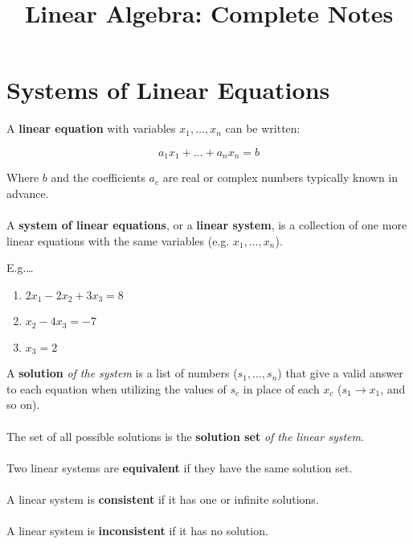 \documentclass[12pt]{article}
\title{Linear Algebra: Complete Notes}
\begin{document}
\maketitle

\section*{Systems of Linear Equations}

A \textbf{linear equation} with variables $x_1,\dots,x_n$ can be written:

$$a_1x_1+\dots+a_nx_n = b$$

Where $b$ and the coefficients $a_c$ are real or complex numbers typically
known in advance. \\ \\

A \textbf{system of linear equations}, or a \textbf{linear system}, is a collection
of one more linear equations with the same variables (e.g. $x_1,\dots,x_n$).

E.g.\dots

\begin{enumerate}
    \item $2x_1 -2x_2 +3x_3 = 8$
    \item $x_2 -4x_3 = -7$
    \item $x_3 = 2$
\end{enumerate}

A \textbf{solution} \emph{of the system} is a list of numbers ($s_1,\dots,s_n$)
that give a valid answer to each equation when utilizing the values of $s_c$
in place of each $x_c$ ($s_1 \rightarrow x_1$, and so on). \\ \\

The set of all possible solutions is the \textbf{solution set} \emph{of the linear system}. \\ \\

Two linear systems are \textbf{equivalent} if they have the same solution set. \\ \\

A linear system is \textbf{consistent} if it has one or infinite solutions. \\ \\

A linear system is \textbf{inconsistent} if it has no solution. \\ \\
\end{document}

